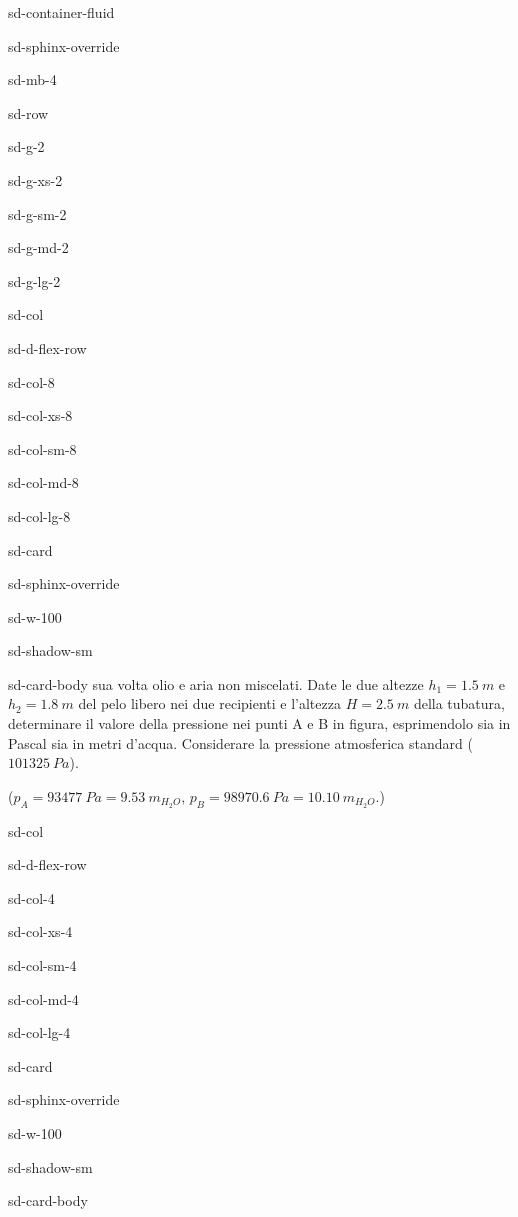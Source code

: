 \documentclass[letterpaper,10pt,italian]{jupyterBook}
\begin{document}
\begin{sphinxuseclass}{sd-container-fluid}
\begin{sphinxuseclass}{sd-sphinx-override}
\begin{sphinxuseclass}{sd-mb-4}
\begin{sphinxuseclass}{sd-row}
\begin{sphinxuseclass}{sd-g-2}
\begin{sphinxuseclass}{sd-g-xs-2}
\begin{sphinxuseclass}{sd-g-sm-2}
\begin{sphinxuseclass}{sd-g-md-2}
\begin{sphinxuseclass}{sd-g-lg-2}
\begin{sphinxuseclass}{sd-col}
\begin{sphinxuseclass}{sd-d-flex-row}
\begin{sphinxuseclass}{sd-col-8}
\begin{sphinxuseclass}{sd-col-xs-8}
\begin{sphinxuseclass}{sd-col-sm-8}
\begin{sphinxuseclass}{sd-col-md-8}
\begin{sphinxuseclass}{sd-col-lg-8}
\begin{sphinxuseclass}{sd-card}
\begin{sphinxuseclass}{sd-sphinx-override}
\begin{sphinxuseclass}{sd-w-100}
\begin{sphinxuseclass}{sd-shadow-sm}
\begin{sphinxuseclass}{sd-card-body}
sua volta olio e aria non miscelati. Date le due altezze \(h_1=1.5\ m\) e \(h_2= 1.8 \ m\)
del pelo libero nei due recipienti e l’altezza \(H= 2.5\ m\) della tubatura,
determinare il valore della pressione nei punti A e B in figura,
esprimendolo sia in Pascal sia in metri d’acqua. Considerare la
pressione atmosferica standard (\(101325\ Pa\)).

\sphinxAtStartPar
(\(p_A=93477\ Pa = 9.53\ m_{H_2O}\), \(p_B=98970.6\ Pa=10.10\ m_{H_2O}\).)

\end{sphinxuseclass}
\end{sphinxuseclass}
\end{sphinxuseclass}
\end{sphinxuseclass}
\end{sphinxuseclass}
\end{sphinxuseclass}
\end{sphinxuseclass}
\end{sphinxuseclass}
\end{sphinxuseclass}
\end{sphinxuseclass}
\end{sphinxuseclass}
\end{sphinxuseclass}
\begin{sphinxuseclass}{sd-col}
\begin{sphinxuseclass}{sd-d-flex-row}
\begin{sphinxuseclass}{sd-col-4}
\begin{sphinxuseclass}{sd-col-xs-4}
\begin{sphinxuseclass}{sd-col-sm-4}
\begin{sphinxuseclass}{sd-col-md-4}
\begin{sphinxuseclass}{sd-col-lg-4}
\begin{sphinxuseclass}{sd-card}
\begin{sphinxuseclass}{sd-sphinx-override}
\begin{sphinxuseclass}{sd-w-100}
\begin{sphinxuseclass}{sd-shadow-sm}
\begin{sphinxuseclass}{sd-card-body}
\sphinxAtStartPar

\end{sphinxuseclass}
\end{sphinxuseclass}
\end{sphinxuseclass}
\end{sphinxuseclass}
\end{sphinxuseclass}
\end{sphinxuseclass}
\end{sphinxuseclass}
\end{sphinxuseclass}
\end{sphinxuseclass}
\end{sphinxuseclass}
\end{sphinxuseclass}
\end{sphinxuseclass}
\end{sphinxuseclass}
\end{sphinxuseclass}
\end{sphinxuseclass}
\end{sphinxuseclass}
\end{sphinxuseclass}
\end{sphinxuseclass}
\end{sphinxuseclass}
\end{sphinxuseclass}
\end{sphinxuseclass}
\end{document}
